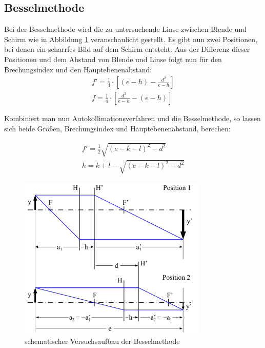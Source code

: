 \documentclass[11pt, a4paper]{article}
\begin{document}
    \subsection{Besselmethode}
    Bei der Besselmethode wird die zu untersuchende Linse zwischen Blende und Schirm wie in Abbildung \ref{fig:BesselAbb} veranschaulicht gestellt.
    Es gibt nun zwei Positionen, bei denen ein scharrfes Bild auf dem Schirm entsteht. Aus der Differenz dieser Positionen und dem Abstand von Blende und Linse folgt nun für den Brechungsindex und den Hauptebenenabstand:
    \begin{align}
    
        f' = \frac{1}{4} \cdot [(e-h)-\frac{d^2}{e-h}]\\
        f = \frac{1}{4} \cdot [\frac{d^2}{e-h}-(e-h)]
            
    \end{align}

    Kombiniert man nun Autokollimationsverfahren und die Besselmethode, so lassen sich beide Größen, Brechungsindex und Hauptebenenabstand, berechen:
    
    \begin{align}
    
        f' = \frac{1}{2} \sqrt{(e-k-l)^2-d^2}\\
        h = k+l- \sqrt{(e-k-l)^2-d^2}
            
    \end{align}
    

    \begin{figure}
        \centering
        \includegraphics[width=0.8\textwidth]{Bessel_Abb.png}
        \caption{schematischer Versuchsaufbau der Besselmethode}   %
        \label{fig:BesselAbb}
    \end{figure}
\end{document}
